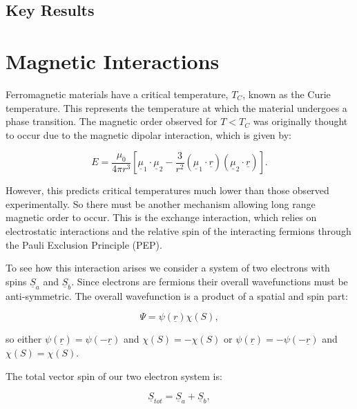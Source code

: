 \subsection{Key Results}

\section{Magnetic Interactions}

Ferromagnetic materials have a critical temperature, $T_C$, known as the Curie temperature. This represents the temperature at which the material undergoes a phase transition. The magnetic order observed for $T < T_C$ was originally thought to occur due to the magnetic dipolar interaction, which is given by:

\begin{equation}
    E = \frac{\mu_0}{4\pi r^3}[\underline{\mu}_1 \cdot \underline{\mu}_2 - \frac{3}{r^2}(\underline{\mu}_1 \cdot \underline{r})(\underline{\mu}_2 \cdot \underline{r})].
    \label{DipolarInteraction}
\end{equation}

\noindent However, this predicts critical temperatures much lower than those observed experimentally. So there must be another mechanism allowing long range magnetic order to occur. This is the exchange interaction, which relies on electrostatic interactions and the relative spin of the interacting fermions through the Pauli Exclusion Principle (PEP).

\noindent To see how this interaction arises we consider a system of two electrons with spins $\underline{S}_a$ and $\underline{S}_b$. Since electrons are fermions their overall wavefunctions must be anti-symmetric. The overall wavefunction is a product of a spatial and spin part:

\begin{equation}
    \Psi = \psi(\underline{r}) \chi(S),
    \label{OverallWavefunction}
\end{equation}

\noindent so either $\psi(\underline{r}) = \psi(-\underline{r})$ and $\chi(S) = - \chi(S)$ or $\psi(\underline{r}) = -\psi(-\underline{r})$ and $\chi(S) =  \chi(S)$.

\noindent The total vector spin of our two electron system is:

\begin{equation}
    \underline{S}_{tot} = \underline{S}_a + \underline{S}_b,
    \label{TotalVectorSpin}
\end{equation}

